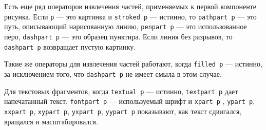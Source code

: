 \documentclass{article} %
\begin{document}
\mbox{}%
%
%
%
%
Есть еще ряд операторов извлечения частей, применяемых к первой 
компоненте рисунка.
Если {\tt p} --- это картинка и {\tt stroked p} --- истинно, то
{\tt pathpart p}\label{Dpathpart} --- это 
путь, описывающий нарисованную линию, 
{\tt penpart p}\label{Dpenpart} --- это 
использованное перо, {\tt dashpart p}\label{Ddashpart} --- 
это образец пунктира.
Если линия без разрывов, то {\tt dashpart p} возвращает пустую картинку.

Такие же операторы для извлечения частей работают, когда {\tt filled p} --- 
истинно, за исключением того, что {\tt dashpart p} не имеет смыла в этом 
случае.

Для текстовых фрагментов, когда {\tt textual p} --- истинно,
{\tt textpart p}\label{Dtextpart}
дает напечатанный текст,
{\tt fontpart p}\label{Dfontpart}
--- используемый шрифт и {\tt xpart~p}%
,
{\tt ypart~p}, {\tt xxpart~p}, {\tt xypart~p}, {\tt yxpart~p}, {\tt yypart~p}
показывают, как текст сдвигался, вращался и масштабировался. 
\end{document}
